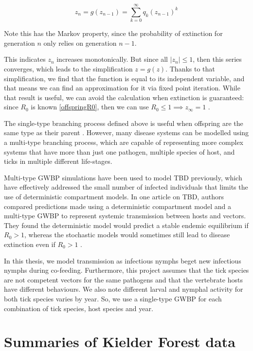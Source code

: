 \documentclass[hidelinks]{article}
\begin{document}
\begin{equation}\label{BranchingProcessRecurrence}
    z_{n} = g(z_{n-1}) = \sum_{k=0}^\infty q_k (z_{n-1})^k
\end{equation}

Note this has the Markov property, since the probability of extinction for generation $ n $ only relies on generation $ n-1 $.

This indicates $ z_n $ increases monotonically. But since all $ |z_n| \le 1 $, then this series converges, which leads to the simplification $ z = g(z) $. Thanks to that simplification, we find that the function is equal to its independent variable, and that means we can find an approximation for it via fixed point iteration. While that result is useful, we can avoid the calculation when extinction is guaranteed: since $ R_0 $ is known \eqref{offspringR0}, then we can use $ R_0 \le 1 \implies z_{\infty} = 1 $ \citep{Diekman2000}.

The single-type branching process defined above is useful when offspring are the same type as their parent \citep{Allen2019}. However, many disease systems can be modelled using a multi-type branching process, which are capable of representing more complex systems that have more than just one pathogen, multiple species of host, and ticks in multiple different life-stages.

Multi-type GWBP simulations have been used to model TBD previously, which have effectively addressed the small number of infected individuals that limits the use of deterministic compartment models. In one article on TBD, authors compared predictions made using a deterministic compartment model and a multi-type GWBP to represent systemic transmission between hosts and vectors. They found the deterministic model would predict a stable endemic equilibrium if $ R_0 > 1 $, whereas the stochastic models would sometimes still lead to disease extinction even if $ R_0 > 1 $ \citep{Maliyoni_2017}. 

In this thesis, we model transmission as infectious nymphs beget new infectious nymphs during co-feeding. Furthermore, this project assumes that the tick species are not competent vectors for the same pathogens and that the vertebrate hosts have different behaviours. We also note different larval and nymphal activity for both tick species varies by year. So, we use a single-type GWBP for each combination of tick species, host species and year.

\newpage

\section{Summaries of Kielder Forest data}
\end{document}
